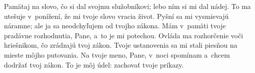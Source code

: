 Pamätaj na slovo, čo si dal svojmu služobníkovi;
lebo ním si mi dal nádej.
\versseparator
To ma utešuje v~ponížení,
že mi tvoje slovo vracia život.
\versseparator
Pyšní sa mi vysmievajú náramne;
ale ja sa neodchyľujem od tvojho zákona.
\versseparator
Mám v~pamäti tvoje pradávne rozhodnutia, Pane,
a~to je mi potechou.
\versseparator
Ovláda ma rozhorčenie
voči hriešnikom, čo zrádzajú tvoj zákon.
\versseparator
Tvoje ustanovenia sa mi stali piesňou
na mieste môjho putovania.
\versseparator
Na tvoje meno, Pane, v~noci spomínam
a~chcem dodržať tvoj zákon.
\versseparator
To je môj údel:
zachovať tvoje príkazy.